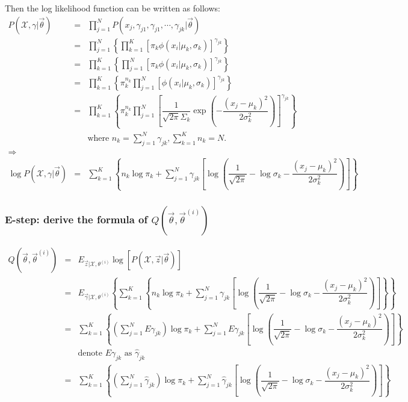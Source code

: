 Then the log likelihood function can be written as follows:
\begin{eqnarray}
P(\mathcal{X},\gamma|\vec{\theta}) &=& \prod\limits_{j=1}^N P(x_j,\gamma_{j1},\gamma_{j1},\cdots,\gamma_{jk}|\vec{\theta})\nonumber \\
       &=& \prod\limits_{j=1}^N\left\{\prod\limits_{k=1}^K\left[\pi_k\phi(x_i|\mu_k,\sigma_k)\right]^{\gamma_{jk}}\right\} \nonumber \\
	   &=& \prod\limits_{k=1}^K\left\{\prod\limits_{j=1}^N\left[\pi_k\phi(x_i|\mu_k,\sigma_k)\right]^{\gamma_{jk}}\right\} \nonumber \\
	   &=& \prod\limits_{k=1}^K\left\{\pi_k^{n_k}\prod\limits_{j=1}^N\left[\phi(x_i|\mu_k,\sigma_k)\right]^{\gamma_{jk}}\right\} \nonumber \\
	   &=& \prod\limits_{k=1}^K\left\{\pi_k^{n_k}\prod\limits_{j=1}^N\left[\dfrac{1}{\sqrt{2\pi}\Sigma_k}\exp{\left(-\dfrac{\left(x_j-\mu_k\right)^2}{2\sigma_k^2}\right)}\right]^{\gamma_{jk}}\right\} \nonumber \\
	   && \text{where } n_k=\sum\limits_{j=1}^N{\gamma_{jk}}, \sum\limits_{k=1}^K{n_k}=N. \nonumber \\
\Rightarrow \nonumber \\
\log{P(\mathcal{X},\gamma|\vec{\theta})} &=& \sum\limits_{k=1}^K\left\{n_k\log\pi_k+\sum\limits_{j=1}^N{\gamma_{jk}\left[\log(\dfrac{1}{\sqrt{2\pi}}-\log\sigma_k-\dfrac{\left(x_j-\mu_k\right)^2}{2\sigma_k^2})\right]}\right\}
\end{eqnarray}


\subsubsection{E-step: derive the formula of $Q(\vec{\theta}, \vec{\theta}^{(i)})$}
\begin{eqnarray}
Q(\vec{\theta}, \vec{\theta}^{(i)}) &=& E_{\vec{z}|\mathcal{X},\theta^{(i)}}\log\left[P(\mathcal{X},\vec{z}|\vec{\theta})\right] \nonumber \\
    &=& E_{\vec{\gamma}|\mathcal{X},\theta^{(i)}}\left\{\sum\limits_{k=1}^K\left\{n_k\log\pi_k+\sum\limits_{j=1}^N{\gamma_{jk}\left[\log(\dfrac{1}{\sqrt{2\pi}}-\log\sigma_k-\dfrac{\left(x_j-\mu_k\right)^2}{2\sigma_k^2})\right]}\right\}\right\} \nonumber \\
	&=& \sum\limits_{k=1}^K\left\{\left(\sum\limits_{j=1}^N{E\gamma_{jk}}\right)\log\pi_k+\sum\limits_{j=1}^N{E\gamma_{jk}\left[\log(\dfrac{1}{\sqrt{2\pi}}-\log\sigma_k-\dfrac{\left(x_j-\mu_k\right)^2}{2\sigma_k^2})\right]}\right\} \nonumber \\
	&& \text{denote } E\gamma_{jk} \text{ as } \hat{\gamma}_{jk} \nonumber \\
	&=& \sum\limits_{k=1}^K\left\{\left(\sum\limits_{j=1}^N{\hat{\gamma}_{jk}}\right)\log\pi_k+\sum\limits_{j=1}^N{\hat{\gamma}_{jk}\left[\log(\dfrac{1}{\sqrt{2\pi}}-\log\sigma_k-\dfrac{\left(x_j-\mu_k\right)^2}{2\sigma_k^2})\right]}\right\} \label{eqn:Q-function} \label{eqn:Q-function}
\end{eqnarray}


